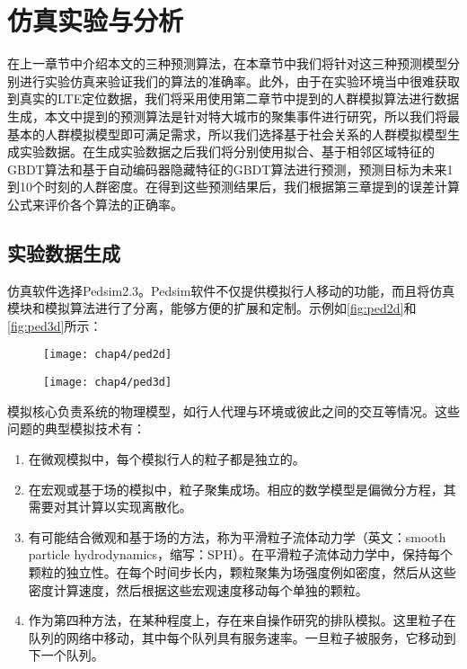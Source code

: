 \chapter{仿真实验与分析}
\label{chap:experiment}

在上一章节中介绍本文的三种预测算法，在本章节中我们将针对这三种预测模型分别进行实验仿真来验证我们的算法的准确率。此外，由于在实验环境当中很难获取到真实的LTE定位数据，我们将采用使用第二章节中提到的人群模拟算法进行数据生成，本文中提到的预测算法是针对特大城市的聚集事件进行研究，所以我们将最基本的人群模拟模型即可满足需求，所以我们选择基于社会关系的人群模拟模型生成实验数据。在生成实验数据之后我们将分别使用拟合、基于相邻区域特征的GBDT算法和基于自动编码器隐藏特征的GBDT算法进行预测，预测目标为未来1到10个时刻的人群密度。在得到这些预测结果后，我们根据第三章提到的误差计算公式来评价各个算法的正确率。

\section{实验数据生成}

仿真软件选择Pedsim2.3。Pedsim软件不仅提供模拟行人移动的功能，而且将仿真模块和模拟算法进行了分离，能够方便的扩展和定制。示例如\ref{fig:ped2d}和\ref{fig:ped3d}所示：

\begin{figure}[!htp]
    \centering
    \texttt{[image: chap4/ped2d]}
\end{figure} 

\begin{figure}[!htp]
    \centering
    \texttt{[image: chap4/ped3d]}
\end{figure} 

模拟核心负责系统的物理模型，如行人代理与环境或彼此之间的交互等情况。这些问题的典型模拟技术有：
\begin{enumerate}
    \item 在微观模拟中，每个模拟行人的粒子都是独立的。
    \item 在宏观或基于场的模拟中，粒子聚集成场。相应的数学模型是偏微分方程，其需要对其计算以实现离散化。
    \item 有可能结合微观和基于场的方法，称为平滑粒子流体动力学（英文：smooth particle hydrodynamics，缩写：SPH）。在平滑粒子流体动力学中，保持每个颗粒的独立性。在每个时间步长内，颗粒聚集为场强度例如密度，然后从这些密度计算速度，然后根据这些宏观速度移动每个单独的颗粒。
    \item 作为第四种方法，在某种程度上，存在来自操作研究的排队模拟。这里粒子在队列的网络中移动，其中每个队列具有服务速率。一旦粒子被服务，它移动到下一个队列。
\end{enumerate}

